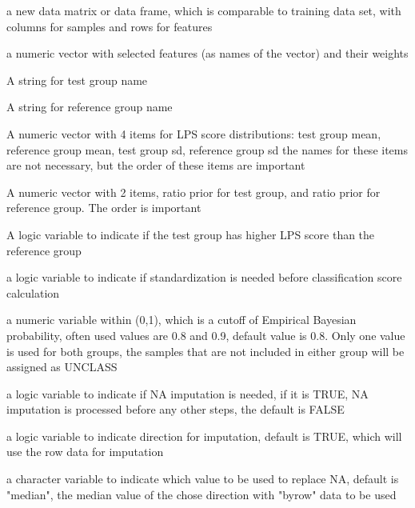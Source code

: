 \documentclass[letterpaper]{book}
\begin{document}
\begin{Arguments}
\begin{ldescription}
\item[\code{newdat}] a new data matrix or data frame, which is comparable to training data set, 
with columns for samples and rows for features

\item[\code{weights}] a numeric vector with selected features (as names of the vector) and their weights

\item[\code{testGroup}] A string for test group name

\item[\code{refGroup}] A string for reference group name

\item[\code{LPSMeanSds}] A numeric vector with 4 items for LPS score distributions: test group mean, reference group mean, test group sd, reference group sd
the names for these items are not necessary, but the order of these items are important

\item[\code{ratioPriors}] A numeric vector with 2 items, ratio prior for test group, and ratio prior for reference group. The order is important

\item[\code{isTestGroupHighLPS}] A logic variable to indicate if the test group has higher LPS score than the reference group

\item[\code{standardization}] a logic variable to indicate if standardization is needed before classification 
score calculation

\item[\code{classProbCut}] a numeric variable within (0,1), which is a cutoff of Empirical Bayesian probability, 
often used values are 0.8 and 0.9, default value is 0.8. Only one value is used for both groups, 
the samples that are not included in either group will be assigned as UNCLASS

\item[\code{imputeNA}] a logic variable to indicate if NA imputation is needed, if it is TRUE, NA imputation is 
processed before any other steps, the default is FALSE

\item[\code{byrow}] a logic variable to indicate direction for imputation, default is TRUE, 
which will use the row data for imputation

\item[\code{imputeValue}] a character variable to indicate which value to be used to replace NA, default is "median", 
the median value of the chose direction with "byrow" data to be used
\end{ldescription}
\end{Arguments}
\end{document}
